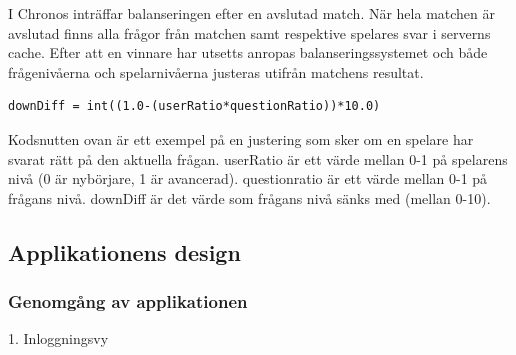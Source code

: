\documentclass[a4paper, 11pt]{article}
\begin{document}
I Chronos inträffar balanseringen efter en avslutad match. När hela matchen är avslutad finns alla frågor från matchen samt respektive spelares svar i serverns cache. Efter att en vinnare har utsetts anropas balanseringssystemet och både frågenivåerna och spelarnivåerna justeras utifrån matchens resultat.

\begin{verbatim}
downDiff = int((1.0-(userRatio*questionRatio))*10.0)
\end{verbatim}

Kodsnutten ovan är ett exempel på en justering som sker om en spelare har svarat rätt på den aktuella frågan. userRatio är ett värde mellan 0-1 på spelarens nivå (0 är nybörjare, 1 är avancerad). questionratio är ett värde mellan 0-1 på frågans nivå. downDiff är det värde som frågans nivå sänks med (mellan 0-10). 

\pagebreak
\subsection{Applikationens design}

\subsubsection{Genomgång av applikationen}

\large \textup{1. Inloggningsvy}
\end{document}

